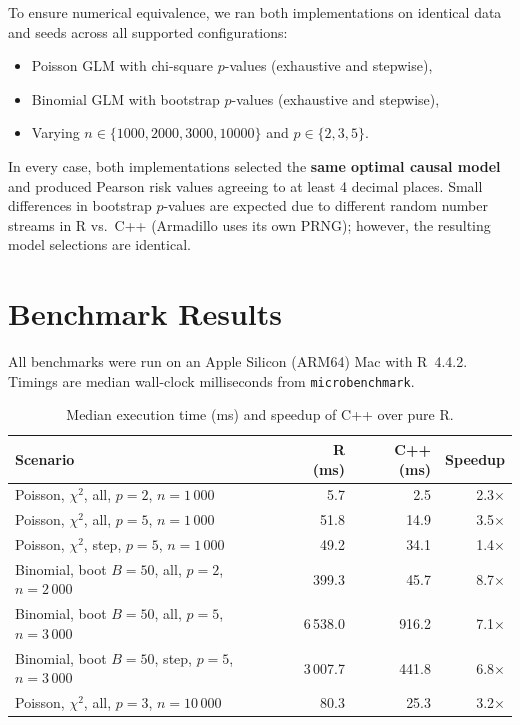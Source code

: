 \documentclass[11pt,a4paper]{article}
\begin{document}
To ensure numerical equivalence, we ran both implementations on identical data
and seeds across all supported configurations:

\begin{itemize}
  \item Poisson GLM with chi-square $p$-values (exhaustive and stepwise),
  \item Binomial GLM with bootstrap $p$-values (exhaustive and stepwise),
  \item Varying $n \in \{1000, 2000, 3000, 10000\}$ and $p \in \{2, 3, 5\}$.
\end{itemize}

In every case, both implementations selected the \textbf{same optimal causal
model} and produced Pearson risk values agreeing to at least 4 decimal places.
Small differences in bootstrap $p$-values are expected due to different random
number streams in R vs.\ C++ (Armadillo uses its own PRNG); however, the
resulting model selections are identical.

\section{Benchmark Results}

All benchmarks were run on an Apple Silicon (ARM64) Mac with R~4.4.2.
Timings are median wall-clock milliseconds from \texttt{microbenchmark}.

\begin{table}[htbp]
\centering
\caption{Median execution time (ms) and speedup of C++ over pure R.}
\label{tab:benchmark}
\begin{tabular}{lrrr}
\toprule
Scenario & R (ms) & C++ (ms) & Speedup \\
\midrule
Poisson, $\chi^2$, all, $p{=}2$, $n{=}1\,000$     &     5.7 &    2.5 & 2.3$\times$ \\
Poisson, $\chi^2$, all, $p{=}5$, $n{=}1\,000$     &    51.8 &   14.9 & 3.5$\times$ \\
Poisson, $\chi^2$, step, $p{=}5$, $n{=}1\,000$    &    49.2 &   34.1 & 1.4$\times$ \\
Binomial, boot $B{=}50$, all, $p{=}2$, $n{=}2\,000$ &   399.3 &   45.7 & 8.7$\times$ \\
Binomial, boot $B{=}50$, all, $p{=}5$, $n{=}3\,000$ & 6\,538.0 &  916.2 & 7.1$\times$ \\
Binomial, boot $B{=}50$, step, $p{=}5$, $n{=}3\,000$ & 3\,007.7 &  441.8 & 6.8$\times$ \\
Poisson, $\chi^2$, all, $p{=}3$, $n{=}10\,000$    &    80.3 &   25.3 & 3.2$\times$ \\
\bottomrule
\end{tabular}
\end{table}
\end{document}

